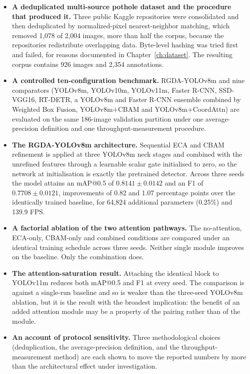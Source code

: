 \documentclass[MScCS]{uccthesis}
\begin{document}
\begin{itemize}
   \item \textbf{A deduplicated multi-source pothole dataset and the procedure
      that produced it.} Three public Kaggle repositories were consolidated and
      then deduplicated by normalized-pixel nearest-neighbor matching, which
      removed 1,078 of 2,004 images, more than half the corpus, because
      the repositories redistribute overlapping data. Byte-level hashing was
      tried first and failed, for reasons documented in
      Chapter~\ref{ch:dataset}. The resulting corpus contains 926 images and
      2,354 annotations.

   \item \textbf{A controlled ten-configuration benchmark.} RGDA-YOLOv8m and
      nine comparators (YOLOv8m, YOLOv10m, YOLOv11m, Faster R-CNN,
      SSD-VGG16, RT-DETR, a YOLOv8m and Faster R-CNN ensemble combined by
      Weighted Box Fusion, YOLOv8m+CBAM and YOLOv8m+CoordAttn) are evaluated
      on the same 186-image validation partition under one average-precision
      definition and one throughput-measurement procedure.

   \item \textbf{The RGDA-YOLOv8m architecture.} Sequential ECA and CBAM
      refinement is applied at three YOLOv8m neck stages and combined with the
      unrefined features through a learnable scalar gate initialised to zero,
      so the network at initialisation is exactly the pretrained detector.
      Across three seeds the model attains an mAP@0.5 of $0.8141 \pm 0.0142$
      and an F1 of $0.7708 \pm 0.0121$, improvements of 0.82 and 1.07
      percentage points over the identically trained baseline, for 64,824
      additional parameters (0.25\%) and 139.9 FPS.

   \item \textbf{A factorial ablation of the two attention pathways.} The
      no-attention, ECA-only, CBAM-only and combined conditions are compared
      under an identical training schedule across three seeds. Neither single
      module improves on the baseline. Only the combination does.

   \item \textbf{The attention-saturation result.} Attaching the identical
      block to YOLOv11m reduces both mAP@0.5 and F1 at every seed. The
      comparison is against a single-run baseline and so is weaker than the
      three-seed YOLOv8m ablation, but it is the result with the broadest
      implication: the benefit of an added attention module may be a property
      of the pairing rather than of the module.

   \item \textbf{An account of protocol sensitivity.} Three methodological
      choices (deduplication, the average-precision definition, and the
      throughput-measurement method) are each shown to move the reported
      numbers by more than the architectural effect under investigation.
\end{itemize}
\end{document}
